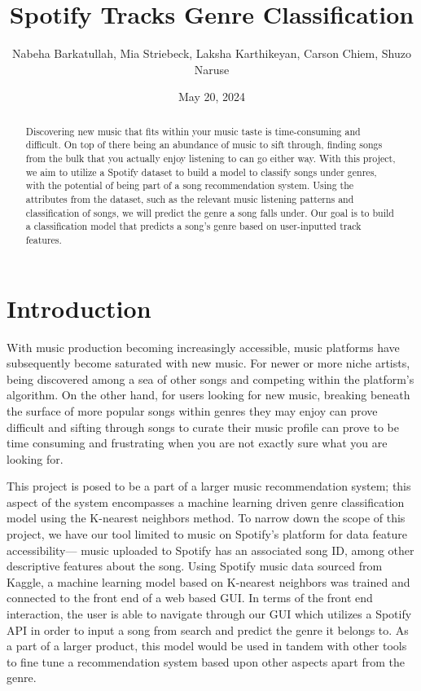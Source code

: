 \documentclass[times, twocolumn]{article}
\title{Spotify Tracks Genre Classification}
\author{Nabeha Barkatullah, Mia Striebeck, Laksha Karthikeyan, Carson Chiem, Shuzo Naruse}
\date{May 20, 2024}
\begin{document}
\maketitle

\newpage
\begin{abstract}
Discovering new music that fits within your music taste is time-consuming and difficult. On top of there being an abundance of music to sift through, finding songs from the bulk that you actually enjoy listening to can go either way. With this project, we aim to utilize a Spotify dataset to build a model to classify songs under genres, with the potential of being part of a song recommendation system. Using the attributes from the dataset, such as the relevant music listening patterns and classification of songs, we will predict the genre a song falls under. Our goal is to build a classification model that predicts a song’s genre based on user-inputted track features.
\end{abstract}
\section{Introduction}
With music production becoming increasingly accessible, music platforms have subsequently become saturated with new music. For newer or more niche artists, being discovered among a sea of other songs and competing within the platform’s algorithm. On the other hand, for users looking for new music, breaking beneath the surface of more popular songs within genres they may enjoy can prove difficult and sifting through songs to curate their music profile can prove to be time consuming and frustrating when you are not exactly sure what you are looking for. 

This project is posed to be a part of a larger music recommendation system; this aspect of the system encompasses a machine learning driven genre classification model using the K-nearest neighbors method. To narrow down the scope of this project, we have our tool limited to music on Spotify’s platform for data feature accessibility— music uploaded to Spotify has an associated song ID, among other descriptive features about the song. Using Spotify music data sourced from Kaggle, a machine learning model based on K-nearest neighbors was trained and connected to the front end of a web based GUI.  In terms of the front end interaction, the user is able to navigate through our GUI which utilizes a Spotify API in order to input a song from search and predict the genre it belongs to. As a part of a larger product, this model would be used in tandem with other tools to fine tune a recommendation system based upon other aspects apart from the genre. 
\end{document}
